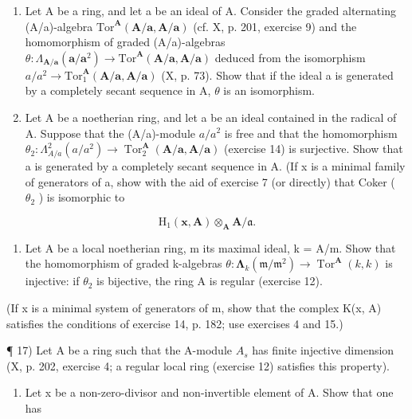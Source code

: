 \begin{enumerate}
\def\labelenumi{\arabic{enumi})}
\setcounter{enumi}{13}
\item
  Let A be a ring, and let a be an ideal of A. Consider the graded alternating (A/a)-algebra \(\mathrm{Tor}^{\mathbf{A}}(\mathbf{A}/\mathbf{a}, \mathbf{A}/\mathbf{a})\) (cf. X, p. 201, exercise 9) and the homomorphism of graded (A/a)-algebras \(\theta: \Lambda_{\mathbf{A}/\mathbf{a}}(\mathbf{a}/\mathbf{a}^{2}) \to \mathrm{Tor}^{\mathbf{A}}(\mathbf{A}/\mathbf{a}, \mathbf{A}/\mathbf{a})\) deduced from the isomorphism \(a/a^{2} \to \mathrm{Tor}_{1}^{\mathbf{A}}(\mathbf{A}/\mathbf{a}, \mathbf{A}/\mathbf{a})\) (X, p. 73). Show that if the ideal a is generated by a completely secant sequence in A, \(\theta\) is an isomorphism.
\item
  Let A be a noetherian ring, and let a be an ideal contained in the radical of A. Suppose that the (A/a)-module \(a/a^{2}\) is free and that the homomorphism \(\theta_{2}: \Lambda_{A/a}^{2}(a/a^{2}) \to \operatorname{Tor}_{2}^{\mathbf{A}}(\mathbf{A}/\mathbf{a}, \mathbf{A}/\mathbf{a})\) (exercise 14) is surjective. Show that a is generated by a completely secant sequence in A. (If x is a minimal family of generators of a, show with the aid of exercise 7 (or directly) that Coker ( \(\theta_{2}\) ) is isomorphic to
\end{enumerate}

\[
\mathrm{H} _ {1} (\boldsymbol {x}, \mathbf {A}) \otimes_ {\mathbf {A}} \mathbf {A} / \mathfrak {a}.
\]

\begin{enumerate}
\def\labelenumi{\arabic{enumi})}
\setcounter{enumi}{15}
\tightlist
\item
  Let A be a local noetherian ring, m its maximal ideal, k = A/m. Show that the homomorphism of graded k-algebras \(\theta : \symbf{\Lambda}_{k}(\mathfrak{m}/\mathfrak{m}^{2}) \to \operatorname{Tor}^{\mathbf{A}}(k, k)\) is injective: if \(\theta_{2}\) is bijective, the ring A is regular (exercise 12).
\end{enumerate}

(If x is a minimal system of generators of m, show that the complex K(x, A) satisfies the conditions of exercise 14, p. 182; use exercises 4 and 15.)

¶ 17) Let A be a ring such that the A-module \(A_{s}\) has finite injective dimension (X, p. 202, exercise 4; a regular local ring (exercise 12) satisfies this property).

\begin{enumerate}
\def\labelenumi{\alph{enumi})}
\tightlist
\item
  Let x be a non-zero-divisor and non-invertible element of A. Show that one has
\end{enumerate}

